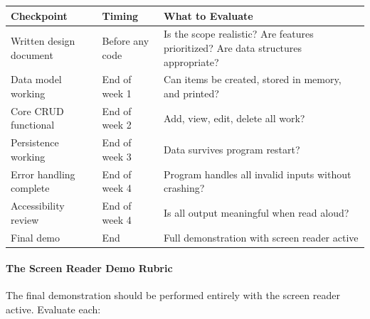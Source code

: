 \documentclass[
  justified,
  openright,
]{tufte-book}
\let\paragraph\paragraph
\let\paragraph\paragraph
\begin{document}
{\def\LTcaptype{none} %
\begin{longtable}[]{@{}
  >{\raggedright\arraybackslash}p{}
  >{\raggedright\arraybackslash}p{}
  >{\raggedright\arraybackslash}p{}@{}}
\toprule\noalign{}
\begin{minipage}[b]{\linewidth}\raggedright
Checkpoint
\end{minipage} & \begin{minipage}[b]{\linewidth}\raggedright
Timing
\end{minipage} & \begin{minipage}[b]{\linewidth}\raggedright
What to Evaluate
\end{minipage} \\
\midrule\noalign{}
\endhead
\bottomrule\noalign{}
\endlastfoot
Written design document & Before any code & Is the scope realistic? Are
features prioritized? Are data structures appropriate? \\
Data model working & End of week 1 & Can items be created, stored in
memory, and printed? \\
Core CRUD functional & End of week 2 & Add, view, edit, delete all
work? \\
Persistence working & End of week 3 & Data survives program restart? \\
Error handling complete & End of week 4 & Program handles all invalid
inputs without crashing? \\
Accessibility review & End of week 4 & Is all output meaningful when
read aloud? \\
Final demo & End & Full demonstration with screen reader active \\
\end{longtable}
}

\paragraph{The Screen Reader Demo
Rubric}\label{the-screen-reader-demo-rubric}

The final demonstration should be performed entirely with the screen
reader active. Evaluate each:
\end{document}

